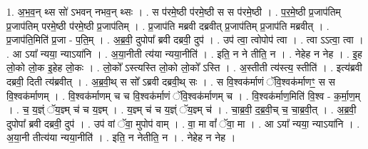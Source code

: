 \documentclass[17pt]{extarticle}
\begin{document}
1. अ॒भ॒व॒न् थ्स सो॑ ऽभवन् नभव॒न् थ्सः । . स प॑रमे॒ष्ठी प॑रमे॒ष्ठी स स प॑रमे॒ष्ठी । . प॒र॒मे॒ष्ठी प्र॒जाप॑तिम् प्र॒जाप॑तिम् परमे॒ष्ठी प॑रमे॒ष्ठी प्र॒जाप॑तिम् । . प्र॒जाप॑ति मब्रवी दब्रवीत् प्र॒जाप॑तिम् प्र॒जाप॑ति मब्रवीत् । . प्र॒जाप॑ति॒मिति॑ प्र॒जा - प॒ति॒म् । . अ॒ब्र॒वी॒ दुपोपा᳚ ब्रवी दब्रवी॒ दुप॑ । . उप॑ त्वा॒ त्वोपोप॑ त्वा । . त्वा ऽऽत्वा॒ त्वा । . आ ऽया᳚ न्यया॒ न्याऽया॑नि । . अ॒या॒नीती त्य॑या न्यया॒नीति॑ । . इति॒ न ने तीति॒ न । . नेहेह न नेह । . इ॒ह लो॒को लो॒क इ॒हेह लो॒कः । . लो॒को᳚ ऽस्त्यस्ति लो॒को लो॒को᳚ ऽस्ति । . अ॒स्तीती त्य॑स्त्य॒ स्तीति॑ । . इत्य॑ब्रवी दब्रवी॒ दिती त्य॑ब्रवीत् । . अ॒ब्र॒वी॒थ् स सो᳚ ऽब्रवी दब्रवी॒थ् सः । . स वि॒श्वक॑र्माणं ॅवि॒श्वक॑र्माणꣳ॒॒ स स वि॒श्वक॑र्माणम् । . वि॒श्वक॑र्माणम् च च वि॒श्वक॑र्माणं ॅवि॒श्वक॑र्माणम् च । . वि॒श्वक॑र्माण॒मिति॑ वि॒श्व - क॒र्मा॒ण॒म् । . च॒ य॒ज्ञ्ं ॅय॒ज्ञ्म् च॑ च य॒ज्ञ्म् । . य॒ज्ञ्म् च॑ च य॒ज्ञ्ं ॅय॒ज्ञ्म् च॑ । . चा॒ब्र॒वी॒ द॒ब्र॒वी॒च् च॒ चा॒ब्र॒वी॒त् । . अ॒ब्र॒वी॒ दुपोपा᳚ ब्रवी दब्रवी॒ दुप॑ । . उप॑ वां ॅवा॒ मुपोप॑ वाम् । . वा॒ मा वां᳚ ॅवा॒ मा । . आ ऽया᳚ न्यया॒ न्याऽया॑नि । . अ॒या॒नी तीत्य॑या न्यया॒नीति॑ । . इति॒ न नेतीति॒ न । . नेहेह न नेह । \newline
\end{document}
